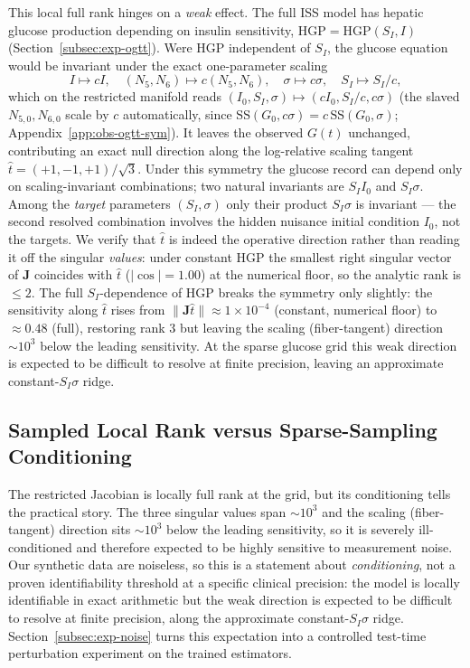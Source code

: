 This local full rank hinges on a \emph{weak} effect. The full ISS model has hepatic glucose production depending on insulin sensitivity, $\mathrm{HGP}=\mathrm{HGP}(S_I,I)$ (Section~\ref{subsec:exp-ogtt}). Were $\mathrm{HGP}$ independent of $S_I$, the glucose equation would be invariant under the exact one-parameter scaling
\begin{equation}
\label{eq:scaling-symmetry}
I\mapsto cI,\quad (N_5,N_6)\mapsto c(N_5,N_6),\quad \sigma\mapsto c\sigma,\quad S_I\mapsto S_I/c,
\end{equation}
which on the restricted manifold reads $(I_0,S_I,\sigma)\mapsto(cI_0,S_I/c,c\sigma)$ (the slaved $N_{5,0},N_{6,0}$ scale by $c$ automatically, since $\mathrm{SS}(G_0,c\sigma)=c\,\mathrm{SS}(G_0,\sigma)$; Appendix~\ref{app:obs-ogtt-sym}). It leaves the observed $G(t)$ unchanged, contributing an exact null direction along the log-relative scaling tangent $\hat t=(+1,-1,+1)/\sqrt3$. Under this symmetry the glucose record can depend only on scaling-invariant combinations; two natural invariants are $S_I I_0$ and $S_I\sigma$. Among the \emph{target} parameters $(S_I,\sigma)$ only their product $S_I\sigma$ is invariant --- the second resolved combination involves the hidden nuisance initial condition $I_0$, not the targets. We verify that $\hat t$ is indeed the operative direction rather than reading it off the singular \emph{values}: under constant HGP the smallest right singular vector of $\mathbf{J}$ coincides with $\hat t$ ($|\cos|=1.00$) at the numerical floor, so the analytic rank is $\le2$. The full $S_I$-dependence of $\mathrm{HGP}$ breaks the symmetry only slightly: the sensitivity along $\hat t$ rises from $\|\mathbf{J}\hat t\|\approx1\times10^{-4}$ (constant, numerical floor) to $\approx0.48$ (full), restoring rank $3$ but leaving the scaling (fiber-tangent) direction $\sim\!10^3$ below the leading sensitivity. At the sparse glucose grid this weak direction is expected to be difficult to resolve at finite precision, leaving an approximate constant-$S_I\sigma$ ridge.

\subsection{Sampled Local Rank versus Sparse-Sampling Conditioning}
The restricted Jacobian is locally full rank at the grid, but its conditioning tells the practical story. The three singular values span $\sim\!10^3$ and the scaling (fiber-tangent) direction sits $\sim\!10^3$ below the leading sensitivity, so it is severely ill-conditioned and therefore expected to be highly sensitive to measurement noise. Our synthetic data are noiseless, so this is a statement about \emph{conditioning}, not a proven identifiability threshold at a specific clinical precision: the model is locally identifiable in exact arithmetic but the weak direction is expected to be difficult to resolve at finite precision, along the approximate constant-$S_I\sigma$ ridge. Section~\ref{subsec:exp-noise} turns this expectation into a controlled test-time perturbation experiment on the trained estimators.

